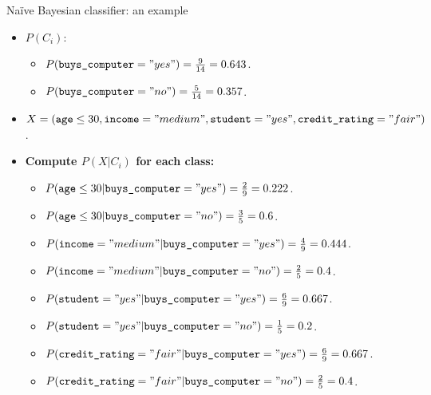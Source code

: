 \documentclass[aspectratio=169,t,table]{beamer}
\begin{document}
  {
    \begin{frame}{Naïve Bayesian classifier: an example}
      \begin{itemize}
        \item $P(C_i)$:
        \begin{itemize}
          \item $P(\texttt{buys\_computer} = "yes") = \frac{9}{14} = 0.643$.
          \item $P(\texttt{buys\_computer} = "no") = \frac{5}{14} = 0.357$.
        \end{itemize}
        \item $X = (\texttt{age} \leq 30 , \texttt{income} = "medium", \texttt{student} = "yes", \texttt{credit\_rating} = "fair")$.
        \item \textbf{Compute $P(X|C_i)$ for each class:}
        \begin{itemize}
          \item $P(\texttt{age} \leq 30 | \texttt{buys\_computer} = "yes") = \frac{2}{9} = 0.222$.
          \item $P(\texttt{age} \leq 30 | \texttt{buys\_computer} = "no") = \frac{3}{5} = 0.6$.
          \item $P(\texttt{income} = "medium" | \texttt{buys\_computer} = "yes") = \frac{4}{9} = 0.444$.
          \item $P(\texttt{income} = "medium" | \texttt{buys\_computer} = "no") = \frac{2}{5} = 0.4$.
          \item $P(\texttt{student} = "yes" | \texttt{buys\_computer} = "yes") = \frac{6}{9} = 0.667$.
          \item $P(\texttt{student} = "yes" | \texttt{buys\_computer} = "no") = \frac{1}{5} = 0.2$.
          \item $P(\texttt{credit\_rating} = "fair" | \texttt{buys\_computer} = "yes") = \frac{6}{9} = 0.667$.
          \item $P(\texttt{credit\_rating} = "fair" | \texttt{buys\_computer} = "no") = \frac{2}{5} = 0.4$.
        \end{itemize}
      \end{itemize}
    \end{frame}
  }
\end{document}
